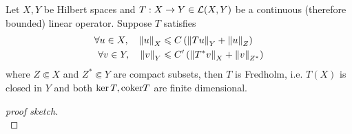 \documentclass{article}
\begin{document}
\begin{ftheorem}
Let $X, Y$ be Hilbert spaces and $T: X \to Y \in \L(X, Y)$ be a continuous (therefore bounded) linear operator. Suppose $T$ satisfies 
\begin{align*}
\forall u \in X, \quad \norm[u]_{X} &\leq C \brac{\norm[Tu]_Y + \norm[u]_Z} \\
\forall v \in Y, \quad \norm[v]_{Y} &\leq C' \brac{\norm[T^*v]_X + \norm[v]_{Z^*}}
\end{align*}
where $Z \Subset X$ and $Z^* \Subset Y$ are compact subsets, then $T$ is Fredholm, i.e. $T(X)$ is closed in $Y$ and both $\ker T, \coker T$ are finite dimensional. 
\end{ftheorem}
\begin{proof}[proof sketch] \hfill \\

\end{proof}
\end{document}
